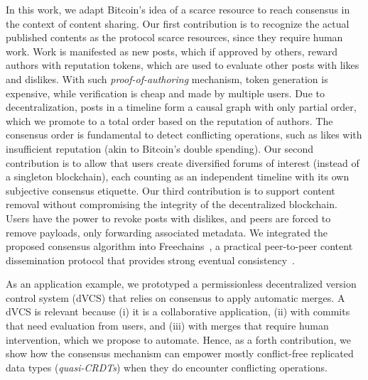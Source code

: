 \documentclass[12pt]{article}
\newcommand{\FC}       {Freechains\xspace}
\newcommand{\reps}     {\emph{reps}\xspace}
\begin{document}
In this work, we adapt Bitcoin's idea of a scarce resource to reach consensus
in the context of content sharing.
%
Our first contribution is to recognize the actual published contents as the
protocol scarce resources, since they require human work.
%
Work is manifested as new posts, which if approved by others, reward authors
with reputation tokens, which are used to evaluate other posts with likes and
dislikes.
With such \emph{proof-of-authoring} mechanism, token generation is expensive,
while verification is cheap and made by multiple users.
%
Due to decentralization, posts in a timeline form a causal graph with only
partial order, which we promote to a total order based on the reputation of
authors.
The consensus order is fundamental to detect conflicting operations, such as
likes with insufficient reputation (akin to Bitcoin's double spending).
%
Our second contribution is to allow that users create diversified forums of
interest (instead of a singleton blockchain), each counting as an independent
timeline with its own subjective consensus etiquette.
%
Our third contribution is to support content removal without compromising the
integrity of the decentralized blockchain.
Users have the power to revoke posts with dislikes, and peers are forced to
remove payloads, only forwarding associated metadata.
%
We integrated the proposed consensus algorithm into \FC~\cite{fcs.sbseg20}, a
practical peer-to-peer content dissemination protocol that provides strong
eventual consistency~\cite{p2p.crdts,p2p.sec}.

As an application example, we prototyped a permissionless decentralized version
control system (dVCS) that relies on consensus to apply automatic merges.
A dVCS is relevant because
    (i)   it is a collaborative application,
    (ii)  with commits that need evaluation from users, and
    (iii) with merges that require human intervention, which we propose to
          automate.
%
Hence, as a forth contribution, we show how the consensus mechanism can empower
mostly conflict-free replicated data types (\emph{quasi-CRDTs}) when they do
encounter conflicting operations.
\end{document}
